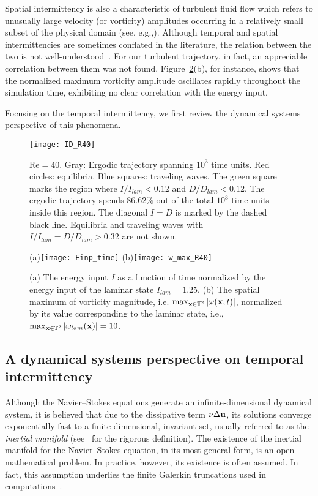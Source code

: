 \documentclass{jfm}
\begin{document}
Spatial intermittency is
also a characteristic of turbulent fluid flow which refers to
unusually large velocity (or vorticity) amplitudes occurring in a relatively small subset of the
physical domain (see, e.g.,).
Although temporal and spatial
intermittencies are sometimes conflated in the literature,
the relation between the two
is not well-understood~\citep{gibbon03}. For our turbulent trajectory, in fact, an appreciable
correlation
between them was not found. Figure~\ref{fig:It}(b), for instance, shows
that the normalized maximum vorticity amplitude oscillates rapidly throughout the simulation
time, exhibiting no clear correlation with the energy input.

Focusing on the temporal intermittency, we first review the dynamical systems
perspective of this phenomena.

\begin{figure}
\centering
\texttt{[image: ID\_R40]}		
\caption{$\mbox{Re}=40$. Gray: Ergodic trajectory spanning $10^3$ time units.
Red circles: equilibria.
Blue squares: traveling waves.
The green square marks the region where $I/I_{lam}<0.12$ and $D/D_{lam}<0.12$.
The ergodic trajectory spends $86.62\%$ out of the total $10^3$ time units inside this region.
The diagonal $I=D$ is marked by the dashed black line.
Equilibria and traveling waves with $I/I_{lam}=D/D_{lam}>0.32$ are not shown.
}
\label{fig:ID_R40}
\end{figure}
%
\begin{figure}
\centering
(a)\texttt{[image: Einp\_time]}
(b)\texttt{[image: w\_max\_R40]}
\caption{(a) The energy input $I$ as a function of time normalized by the energy
input of the laminar state $I_{lam}=1.25$.
(b) The spatial maximum of
vorticity magnitude, i.e. $\max_{\mathbf x\in\mathbb T^2}|\omega(\mathbf x,t)|$, normalized by its value
corresponding to the laminar state, i.e.,
$\max_{\mathbf x\in\mathbb T^2}|\omega_{lam}(\mathbf x)|=10$.
}
\label{fig:It}
\end{figure}

\subsection{A dynamical systems perspective on temporal intermittency}\label{sec:inter_DS}
Although the Navier--Stokes equations generate an infinite-dimensional dynamical system,
it is believed that due to the dissipative term $\nu\Delta\mathbf u$, its
solutions converge exponentially fast to a
finite-dimensional, invariant set, usually referred to as the \emph{inertial manifold}
(see~\cite{const12} for the rigorous definition). The existence of the
inertial manifold for the Navier--Stokes equation, in its most general form,
is an open mathematical problem. In
practice, however, its existence is often assumed. In fact, this assumption
underlies the finite Galerkin truncations used in computations~\citep{foias88}.
\end{document}
